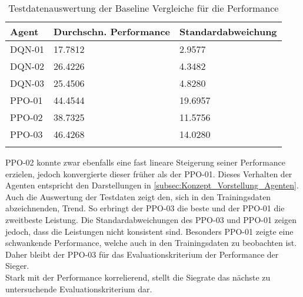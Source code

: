\begin{longtable}[H]{|p{4.5cm}|p{4.5cm}|p{4.5cm}|}
	\hline
	Agent & Durchschn. Performance & Standardabweichung \\
	\hline
	DQN-01 & 17.7812 & 2.9577 \\
	\hline
	DQN-02 & 26.4226 & 4.3482 \\
	\hline
	DQN-03 & 25.4506 & 4.8280 \\
	\hline
	PPO-01 & 44.4544 & 19.6957 \\
	\hline
	PPO-02 & 38.7325 & 11.5756 \\
	\hline
	PPO-03 & 46.4268 & 14.0280 \\
	\hline
\caption{Testdatenauswertung der Baseline Vergleiche für die Performance}
\label{tab:Evaluation_Testdaten_Performance} 
\end{longtable}
PPO-02 konnte zwar ebenfalls eine fast lineare Steigerung seiner Performance erzielen, jedoch konvergierte dieser früher als der PPO-01.
Dieses Verhalten der Agenten entspricht den Darstellungen in \autoref{subsec:Konzept_Vorstellung_Agenten}.
Auch die Auswertung der Testdaten  zeigt den, sich in den Trainingsdaten abzeichnenden, Trend. So erbringt der PPO-03 die beste und der PPO-01 die zweitbeste Leistung. Die Standardabweichungen des PPO-03 und PPO-01 zeigen jedoch, dass die Leistungen nicht konsistent sind. Besonders PPO-01 zeigte eine schwankende Performance, welche auch in den Trainingsdaten  zu beobachten ist.
Daher bleibt der PPO-03 für das Evaluationskriterium der Performance der Sieger.\\
Stark mit der Performance korrelierend, stellt die Siegrate das nächste zu untersuchende Evaluationskriterium dar.

